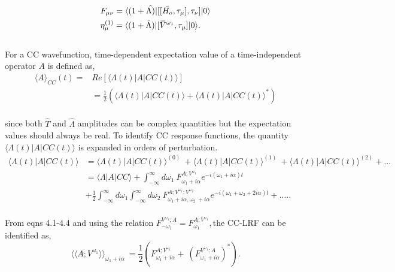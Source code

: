 \begin{equation}
\begin{split}
& F_{\mu\nu} = \bra{(1+ \hat{\Lambda)}}[[\bar{H_o}, \tau_\mu],\tau_\nu]\ket{0}\\
& \eta^{(1)}_{\mu} = \bra{(1+ \hat{\Lambda})}[\overbar{V}^{\omega_1}, \tau_\mu]\ket{0}.\\
\end{split}
\end{equation}
\\
For a CC wavefunction, time-dependent expectation value of a time-independent operator 
$A$ is defined as\cite{Pedersen97},
\\
\begin{equation}
\begin{split}
{\langle A \rangle}_{CC} (t) = & Re [\langle \Lambda(t) | A | CC(t)\rangle ]\\
& = \frac{1}{2} (\langle \Lambda(t) | A | CC(t)\rangle  + {\langle \Lambda(t) | A | CC(t)\rangle}^{*})
\end{split}
\end{equation}
\\
since both $\hat{T}$ and $\hat{\Lambda}$ amplitudes can be complex quantities but 
the expectation values should always be real. To identify CC response functions,  
the quantity $\langle \Lambda(t) | A | CC(t)\rangle$ is expanded in orders of 
perturbation\cite{Pedersen97}.
\\
\begin{equation}
\begin{split}
\langle \Lambda(t) | A | CC(t) \rangle & = {\langle \Lambda(t) | A | CC(t) \rangle}^{(0)}\
 + {\langle \Lambda(t) | A | CC(t) \rangle}^{(1)} \
+ {\langle \Lambda(t) | A | CC(t) \rangle}^{(2)} + ... \\
& = \langle \Lambda | A | CC \rangle + \int_{-\infty}^{\infty}d\omega_1 \
F^{A;V^{\omega_1}}_{\omega_1 + i\alpha}e^{-i(\omega_1 + i\alpha)t} \\
& + \frac{1}{2} \int_{-\infty}^{\infty}d\omega_1\int_{-\infty}^{\infty}d\omega_2\
F^{A;V^{\omega_1};V^{\omega_2}}_{\omega_1 + i\alpha,\omega_2 \
+ i\alpha}e^{-i(\omega_1 + \omega_2 + 2i\alpha)t} + .....
\end{split}
\end{equation}
\\
From eqns 4.1-4.4 and using the relation $F^{V^{\omega_1};A}_{-\omega_1}=F^{A;V^{\omega_1}}_{\omega_1},$the CC-LRF can be identified as,
\\
\begin{equation}
{\langle\langle A;V^{\omega_1} \rangle\rangle}_{\omega_1 + i\alpha} \
= \frac{1}{2}( F^{A;V^{\omega_1}}_{\omega_1 + i\alpha} + \
(F^{V^{\omega_1};A}_{\omega_1 + i\alpha})^{*}).
\end{equation}
